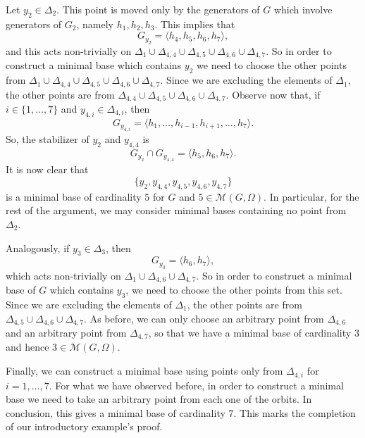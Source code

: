 \documentclass{amsart}
\begin{document}
	 Let $y_2 \in \Delta_2$. This point is moved only by the generators of $G$ which involve generators of $G_2$, namely $h_1,h_2,h_3$. This implies that $$G_{y_2} = \langle h_4,h_5,h_6,h_7 \rangle,$$ and this acts non-trivially on $\Delta_1 \cup \Delta_{4,4} \cup \Delta_{4,5}\cup\Delta_{4,6} \cup \Delta_{4,7}$. So in order to construct a minimal base which contains $y_2$ we need to choose the other points from $\Delta_1 \cup \Delta_{4,4} \cup \Delta_{4,5}\cup\Delta_{4,6} \cup \Delta_{4,7}$. Since we are excluding the elements of $\Delta_1$, the other points are from $\Delta_{4,4} \cup \Delta_{4,5}\cup\Delta_{4,6} \cup \Delta_{4,7}.$  Observe now that, if $i\in \{1,\dots, 7\}$ and $y_{4,i} \in \Delta_{4,i}$, then $$G_{y_{4,i}} = \langle h_1,\dots,h_{i-1},h_{i+1},\dots,h_7 \rangle. $$ So, the stabilizer of $y_2$ and $y_{4,4}$ is
	\[
		G_{y_2} \cap G_{y_{4,4}} = \langle h_5,h_6,h_7 \rangle.
	\]
	It is now clear that $$\{y_2,y_{4,4},y_{4,5},y_{4,6},y_{4,7}\}$$ is a minimal base of cardinality $5$ for $G$ and $5\in\mathcal{M}(G,\Omega)$. In particular, for the rest of the argument, we may consider minimal bases containing no point from $\Delta_2$.
	
	Analogously, if $y_3 \in \Delta_3$, then $$G_{y_3} = \langle h_6, h_7\rangle,$$ which acts non-trivially on $\Delta_1 \cup \Delta_{4,6} \cup \Delta_{4,7}$. So in order to construct a minimal base of $G$ which contains $y_3$, we need to choose the other points from this set. Since we are excluding the elements of $\Delta_1$, the other points are from $ \Delta_{4,5}\cup\Delta_{4,6} \cup \Delta_{4,7}.$ As before, we can only choose an arbitrary point from $\Delta_{4,6}$ and an arbitrary point from $\Delta_{4,7}$, so that we have a minimal base of cardinality $3$ and hence $3\in\mathcal{M}(G,\Omega)$. 
	
	Finally, we can construct a minimal base using points only from $\Delta_{4,i}$ for $i=1,\dots,7$. For what we have observed before, in order to construct a minimal base we need to take an arbitrary point from each one of the orbits. In conclusion, this gives a minimal base of cardinality $7$. This marks the completion of our introductory example's proof.
	

\smallskip	
	
\end{document}
